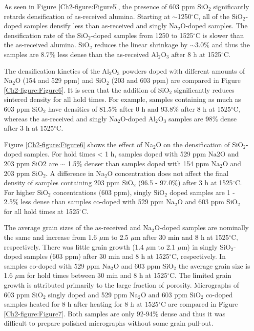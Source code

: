 As seen in Figure \ref{Ch2-figure:Figure5}, the presence of 603 ppm SiO$_{2}$ significantly retards densification of as-received alumina. Starting at $\sim$1250$^{\circ}$C, all of the SiO$_{2}$-doped samples densify less than as-received and singly Na$_{2}$O-doped samples. The densification rate of the SiO$_{2}$-doped samples from 1250 to 1525$^{\circ}$C is slower than the as-received alumina. SiO$_{2}$ reduces the linear shrinkage by $\sim$3.0\% and thus the samples are 8.7\% less dense than the as-received Al$_{2}$O$_{3}$ after 8 h at 1525$^{\circ}$C. 

The densification kinetics of the Al$_{2}$O$_{3}$ powders doped with different amounts of Na$_{2}$O (154 and 529 ppm) and SiO$_{2}$ (203 and 603 ppm) are compared in Figure \ref{Ch2-figure:Figure6}. It is seen that the addition of SiO$_{2}$ significantly reduces sintered density for all hold times. For example, samples containing as much as 603 ppm SiO$_{2}$ have densities of 81.5\% after 0 h and 93.8\% after 8 h at 1525$^{\circ}$C, whereas the as-received and singly Na$_{2}$O-doped Al$_{2}$O$_{3}$ samples are 98\% dense after 3 h at 1525$^{\circ}$C. 

Figure \ref{Ch2-figure:Figure6} shows the effect of Na$_{2}$O on the densification of SiO$_{2}$-doped samples. For hold times < 1 h, samples doped with 529 ppm Na2O and 203 ppm SiO2 are $\sim$ 1.5\% denser than samples doped with 154 ppm Na$_{2}$O and 203 ppm SiO$_{2}$. A difference in Na$_{2}$O concentration does not affect the final density of samples containing 203 ppm SiO$_{2}$ (96.5 - 97.0\%) after 3 h at 1525$^{\circ}$C. For higher SiO$_{2}$ concentrations (603 ppm), singly SiO$_{2}$ doped samples are 1 - 2.5\% less dense than samples co-doped with 529 ppm Na$_{2}$O and 603 ppm SiO$_{2}$ for all hold times at 1525$^{\circ}$C. 

The average grain sizes of the as-received and Na$_{2}$O-doped samples are nominally the same and increase from 1.6 $\mu$m to 2.5 $\mu$m after 30 min and 8 h at 1525$^{\circ}$C, respectively. There was little grain growth (1.4 $\mu$m to 2.1 $\mu$m) in singly SiO$_{2}$-doped samples (603 ppm) after 30 min and 8 h at 1525$^{\circ}$C, respectively. In samples co-doped with 529 ppm Na$_{2}$O and 603 ppm SiO$_{2}$ the average grain size is 1.6 $\mu$m for hold times between 30 min and 8 h at 1525$^{\circ}$C. The limited grain growth is attributed primarily to the large fraction of porosity. Micrographs of 603 ppm SiO$_{2}$ singly doped and 529 ppm Na$_{2}$O and 603 ppm SiO$_{2}$ co-doped samples heated for 8 h after heating for 8 h at 1525$^{\circ}$C are compared in Figure \ref{Ch2-figure:Figure7}. Both samples are only 92-94\% dense and thus it was difficult to prepare polished micrographs without some grain pull-out. 

